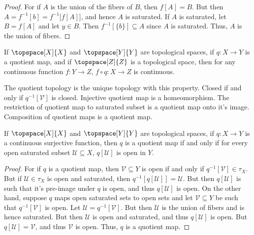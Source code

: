     \begin{proof}
        For if $A$ is the union of the fibers of $B$, then
        $f[A]=B$. But then $A=f^{\minus{1}}[b]=f^{\minus{1}}\big[f[A]\big]$,
        and hence $A$ is saturated. If $A$ is saturated, let $B=f[A]$ and
        let $y\in{B}$. Then $f^{\minus{1}}[\{b\}]\subseteq{A}$ since $A$ is
        saturated. Thus, $A$ is the union of fibers.
    \end{proof}
    \begin{theorem}
        If $\topspace[X]{X}$ and $\topspace[Y]{Y}$ are topological spaces,
        if $q:X\rightarrow{Y}$ is a quotient map, and if
        $\topspace[Z]{Z}$ is a topological space, then for any continuous
        function $f:Y\rightarrow{Z}$, $f\circ{q}:X\rightarrow{Z}$ is
        continuous.
    \end{theorem}
    The quotient topology is the unique topology with this property. Closed
    if and only if $q^{\minus{1}}[\mathcal{V}]$ is closed. Injective
    quotient map is a homeomorphism. The restriction of quotient map to
    saturated subset is a quotient map onto it's image. Composition of
    quotient maps is a quotient map.
    \begin{theorem}
        If $\topspace[X]{X}$ and $\topspace[Y]{Y}$ are topological spaces,
        if $q:X\rightarrow{Y}$ is a continuous surjective function, then
        $q$ is a quotient map if and only if for every open saturated subset
        $\mathcal{U}\subseteq{X}$, $q[\mathcal{U}]$ is open in $Y$.
    \end{theorem}
    \begin{proof}
        For if $q$ is a quotient map, then $\mathcal{V}\subseteq{Y}$ is
        open if and only if $q^{\minus{1}}[\mathcal{V}]\in\tau_{X}$. But
        if $\mathcal{U}\in\tau_{X}$ is open and saturated, then
        $q^{\minus{1}}[q[\mathcal{U}]]=\mathcal{U}$. But then
        $q[\mathcal{U}]$ is such that it's pre-image under $q$ is open, and
        thus $q[\mathcal{U}]$ is open. On the other hand, suppose $q$ maps
        open saturated sets to open sets and let $\mathcal{V}\subseteq{Y}$
        be such that $q^{\minus{1}}[\mathcal{V}]$ is open. Let
        $\mathcal{U}=q^{\minus{1}}[\mathcal{V}]$. But then $\mathcal{U}$ is
        the union of fibers and is hence saturated. But then $\mathcal{U}$
        is open and saturated, and thus $q[\mathcal{U}]$ is open. But
        $q[\mathcal{U}]=\mathcal{V}$, and thus $\mathcal{V}$ is open. Thus,
        $q$ is a quotient map.
    \end{proof}
